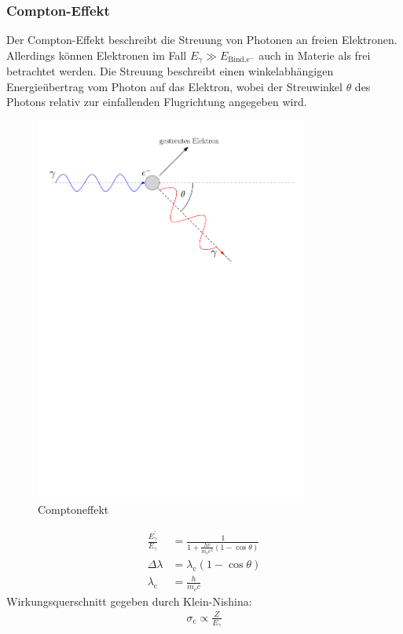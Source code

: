 \documentclass[11pt, a4paper]{article}
\numberwithin{equation}{section}
\begin{document}
\subsubsection{Compton-Effekt}
Der Compton-Effekt beschreibt die Streuung von Photonen an freien Elektronen.
Allerdings können Elektronen im Fall $E_\gamma \gg E_\mathrm{Bind. e^{-}}$ auch in Materie als frei betrachtet werden.
Die Streuung beschreibt einen winkelabhängigen Energieübertrag vom Photon auf das Elektron, wobei der Streuwinkel $\theta$ des Photons relativ zur einfallenden Flugrichtung angegeben wird.
\begin{figure}
	\centering
	\includegraphics[width=0.8\textwidth]{./figures/compton.pdf}
	\caption{Comptoneffekt}
	\label{fig:comptoneffekt}
\end{figure}
\begin{align}
	\frac{E_\gamma^\prime}{E_\gamma} &= \frac{1}{1 + \frac{h \nu}{m_\mathrm{e} c^2} (1-\cos\theta)} \\
	\Delta \lambda &= \lambda_\mathrm{c} (1 - \cos\theta) \\
	\lambda_\mathrm{c} &= \frac{h}{m_\mathrm{e} c}
\end{align}
Wirkungsquerschnitt gegeben durch Klein-Nishina:
\begin{align}
	\sigma_\mathrm{c} \propto \frac{Z}{E_\gamma}
\end{align}
\end{document}
